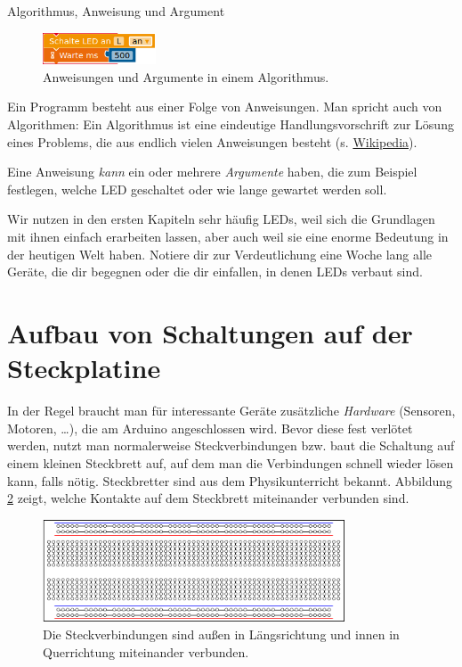 \begin{zsfg}{{Algorithmus, Anweisung und Argument}}
	\begin{figure}
		\centering
		\includegraphics[width=0.3\textwidth]{./pics/anweisungen-bsp.png}
		\caption{Anweisungen und Argumente in einem Algorithmus.}
		\label{abb:befehlbsp}
	\end{figure}
	Ein Programm besteht aus einer Folge von Anweisungen. Man spricht auch von Algorithmen: Ein Algorithmus ist eine eindeutige Handlungsvorschrift zur Lösung eines Problems, die aus endlich vielen Anweisungen besteht (s. \href{https://de.wikipedia.org/wiki/Algorithmus}{Wikipedia}).
	
	Eine Anweisung \emph{kann} ein oder mehrere \emph{Argumente} haben, die zum Beispiel festlegen, welche LED geschaltet oder wie lange gewartet werden soll.
\end{zsfg}

\begin{aufgabe}
	Wir nutzen in den ersten Kapiteln sehr häufig LEDs, weil sich die Grundlagen mit ihnen einfach erarbeiten lassen, aber auch weil sie eine enorme Bedeutung in der heutigen Welt haben. Notiere dir zur Verdeutlichung eine Woche lang alle Geräte, die dir begegnen oder die dir einfallen, in denen LEDs verbaut sind.
\end{aufgabe}
\vfill

\newpage
\section{Aufbau von Schaltungen auf der Steckplatine}

In der Regel braucht man für interessante Geräte zusätzliche \emph{Hardware} (Sensoren, Motoren, \dots), die am Arduino angeschlossen wird. Bevor diese fest verlötet werden, nutzt man normalerweise Steckverbindungen bzw. baut die Schaltung auf einem kleinen Steckbrett auf, auf dem man die Verbindungen schnell wieder lösen kann, falls nötig. Steckbretter sind aus dem Physikunterricht bekannt. Abbildung \ref{abb:steckbrett} zeigt, welche Kontakte auf dem Steckbrett miteinander verbunden sind.

\begin{figure}[H]
	\centering
	\includegraphics[width=0.8\textwidth]{./Zeichnungen/steckbrett.png}
	\caption{Die Steckverbindungen sind außen in Längsrichtung und innen in Querrichtung miteinander verbunden.}
	\label{abb:steckbrett}
\end{figure}

